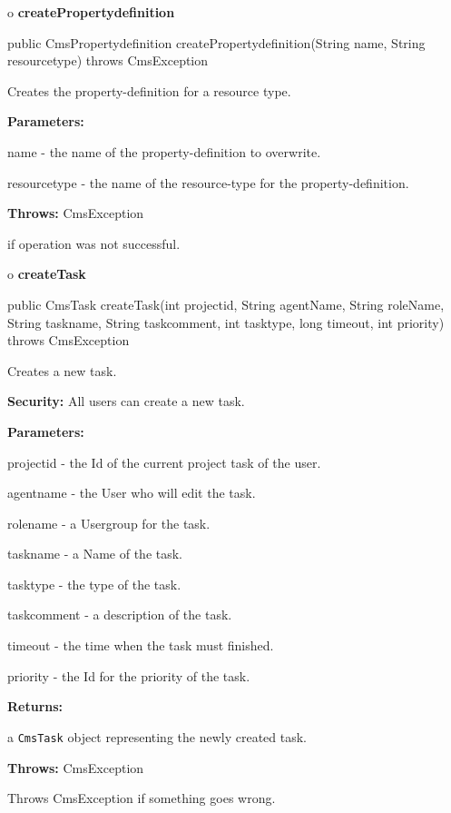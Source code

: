 o {\bf createPropertydefinition}

\begin{PRE}
 public CmsPropertydefinition createPropertydefinition(String name,
                                                       String resourcetype) throws CmsException
\end{PRE}

\begin{description}
\htmlDD Creates the property-definition for a resource type.

\begin{description}
\item {\bf Parameters:}

name - the name of the property-definition to overwrite.

resourcetype - the name of the resource-type for the property-definition.
\item {\bf Throws:} CmsException

if operation was not successful.
\end{description}

\end{description}

o {\bf createTask}

\begin{PRE}
 public CmsTask createTask(int projectid,
                           String agentName,
                           String roleName,
                           String taskname,
                           String taskcomment,
                           int tasktype,
                           long timeout,
                           int priority) throws CmsException
\end{PRE}

\begin{description}
\htmlDD Creates a new task.

{\bf Security:} All users can create a new task.

\begin{description}
\item {\bf Parameters:}

projectid - the Id of the current project task of the user.

agentname - the User who will edit the task.

rolename - a Usergroup for the task.

taskname - a Name of the task.

tasktype - the type of the task.

taskcomment - a description of the task.

timeout - the time when the task must finished.

priority - the Id for the priority of the task.
\item {\bf Returns:}

a {\tt CmsTask} object representing the newly created task.
\item {\bf Throws:} CmsException

Throws CmsException if something goes wrong.
\end{description}

\end{description}

